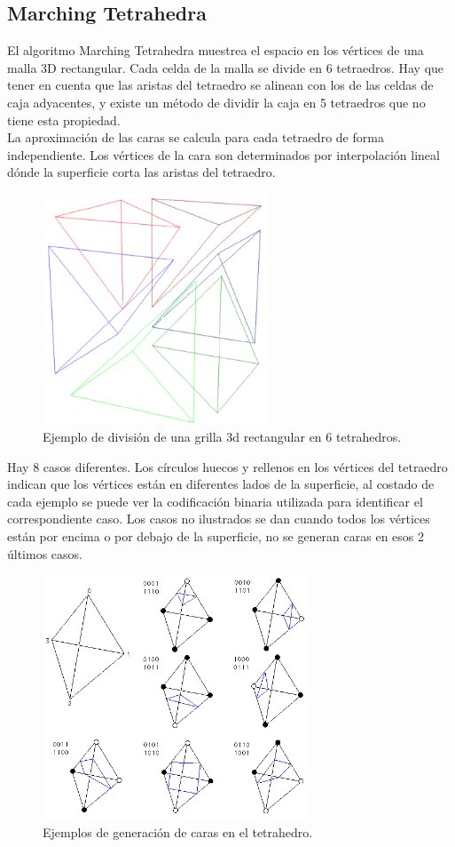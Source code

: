 \documentclass[12pt]{article}
\begin{document}
\subsection{Marching Tetrahedra}
El algoritmo Marching Tetrahedra\cite{marching}\cite{marchingt} muestrea el espacio en los vértices de una malla 3D rectangular. Cada celda de la malla se divide en 6 tetraedros. Hay que tener en cuenta que las aristas del tetraedro se alinean con los de las celdas de caja adyacentes, y existe un método de dividir la caja en 5 tetraedros que no tiene esta propiedad.
\\La aproximación de las caras se calcula para cada tetraedro de forma independiente. Los vértices de la cara son determinados por interpolación lineal dónde la superficie corta las aristas del tetraedro.
\begin{figure}[h!]
\includegraphics[width=0.6\textwidth,center]{mt1.png}
\caption{Ejemplo de división de una grilla 3d rectangular en 6 tetrahedros.}
\end{figure}
\clearpage
Hay 8 casos diferentes. Los círculos huecos y rellenos en los vértices del tetraedro indican que los vértices están en diferentes lados de la superficie, al costado de cada ejemplo se puede ver la codificación binaria utilizada para identificar el correspondiente caso. Los casos no ilustrados se dan cuando todos los vértices están por encima o por debajo de la superficie, no se generan caras en esos 2 últimos casos.\\
\begin{figure}[h!]
\includegraphics[width=0.7\textwidth,center]{mt2.png}
\caption{Ejemplos de generación de caras en el tetrahedro.}
\end{figure}\\
\end{document}
